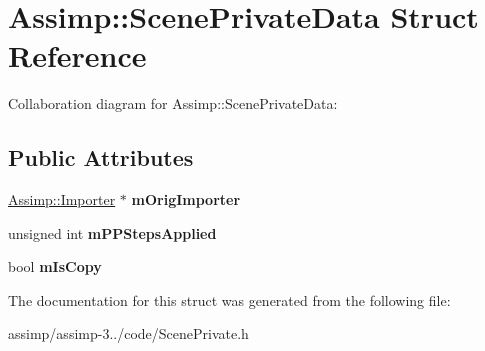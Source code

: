 \hypertarget{struct_assimp_1_1_scene_private_data}{\section{Assimp\+:\+:Scene\+Private\+Data Struct Reference}
\label{struct_assimp_1_1_scene_private_data}
}


Collaboration diagram for Assimp\+:\+:Scene\+Private\+Data\+:
\subsection*{Public Attributes}
\begin{DoxyCompactItemize}
\item 
\hypertarget{struct_assimp_1_1_scene_private_data_a4a5c1fccdfbfa36ab5c34b0eb7f6963f}{\hyperlink{class_assimp_1_1_importer}{Assimp\+::\+Importer} $\ast$ {\bfseries m\+Orig\+Importer}}\label{struct_assimp_1_1_scene_private_data_a4a5c1fccdfbfa36ab5c34b0eb7f6963f}

\item 
\hypertarget{struct_assimp_1_1_scene_private_data_a8efc5ac3c6bd4d1442f630994ae56eff}{unsigned int {\bfseries m\+P\+P\+Steps\+Applied}}\label{struct_assimp_1_1_scene_private_data_a8efc5ac3c6bd4d1442f630994ae56eff}

\item 
\hypertarget{struct_assimp_1_1_scene_private_data_a36be36846fab7e5d7ea7fde12981dc50}{bool {\bfseries m\+Is\+Copy}}\label{struct_assimp_1_1_scene_private_data_a36be36846fab7e5d7ea7fde12981dc50}

\end{DoxyCompactItemize}


The documentation for this struct was generated from the following file\+:\begin{DoxyCompactItemize}
\item 
assimp/assimp-\/3../code/Scene\+Private.\+h\end{DoxyCompactItemize}
